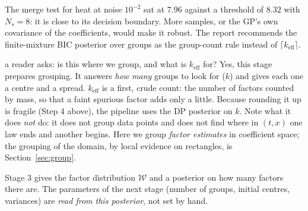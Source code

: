 \begin{caution}[title=Thin margins]
The merge test for heat at noise $10^{-2}$ sat at $7.96$ against a threshold of $8.32$ with $N_s=8$: it is close to its decision boundary. More samples, or the GP's own covariance of the coefficients, would make it robust. The report recommends the finite-mixture BIC posterior over groups as the group-count rule instead of $\lceil k_{\mathrm{eff}}\rceil$.
\end{caution}

\begin{explained}{a reader asks: is this where we group, and what is $k_{\mathrm{eff}}$ for?}
Yes, this stage prepares grouping. It answers \emph{how many} groups to look for ($k$) and gives each one a centre and a spread. $k_{\mathrm{eff}}$ is a first, crude count: the number of factors counted by mass, so that a faint spurious factor adds only a little. Because rounding it up is fragile (Step 4 above), the pipeline uses the DP posterior on $k$. Note what it does \emph{not} do: it does not group data points and does not find where in $(t,x)$ one law ends and another begins. Here we group \emph{factor estimates} in coefficient space; the grouping of the domain, by local evidence on rectangles, is Section~\ref{sec:group}.
\end{explained}

\begin{takeaway}
Stage 3 gives the factor distribution $\mathcal W$ and a posterior on how many factors there are. The parameters of the next stage (number of groups, initial centres, variances) are \emph{read from this posterior}, not set by hand.
\end{takeaway}

